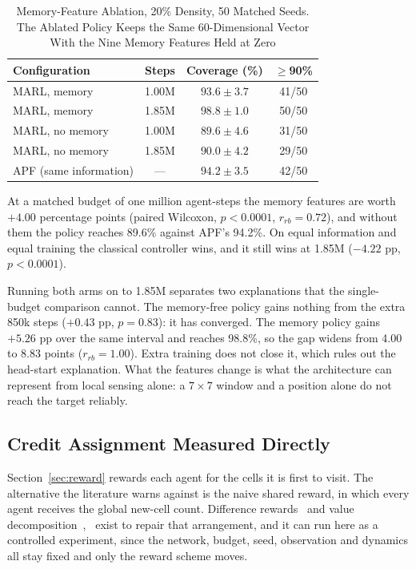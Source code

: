 \documentclass[a4paper, 10pt, conference]{ieeeconf}
\begin{document}
\begin{table}[htb]
\centering
\caption{Memory-Feature Ablation, 20\% Density, 50 Matched Seeds. The
Ablated Policy Keeps the Same 60-Dimensional Vector With the Nine
Memory Features Held at Zero}
\label{tab:ablation}
\scriptsize
\setlength{\tabcolsep}{3pt}
\begin{tabular}{lccc}
\toprule
\textbf{Configuration} & \textbf{Steps} & \textbf{Coverage (\%)} &
\textbf{$\geq$90\%} \\
\midrule
MARL, memory     & 1.00M & $93.6\pm3.7$ & 41/50 \\
MARL, memory     & 1.85M & $98.8\pm1.0$ & 50/50 \\
MARL, no memory  & 1.00M & $89.6\pm4.6$ & 31/50 \\
MARL, no memory  & 1.85M & $90.0\pm4.2$ & 29/50 \\
APF (same information) & --- & $94.2\pm3.5$ & 42/50 \\
\bottomrule
\end{tabular}
\end{table}

At a matched budget of one million agent-steps the memory features are
worth $+4.00$ percentage points (paired Wilcoxon, $p<0.0001$,
$r_{rb}=0.72$), and without them the policy reaches 89.6\% against
APF's 94.2\%. On equal information and equal training the classical
controller wins, and it still wins at 1.85M ($-4.22$ pp, $p<0.0001$).

Running both arms on to 1.85M separates two explanations that the
single-budget comparison cannot. The memory-free policy gains nothing
from the extra 850k steps ($+0.43$ pp, $p=0.83$): it has converged.
The memory policy gains $+5.26$ pp over the same interval and reaches
98.8\%, so the gap widens from 4.00 to 8.83 points ($r_{rb}=1.00$).
Extra training does not close it, which rules out the head-start
explanation. What the features change is what the architecture can
represent from local sensing alone: a $7\times7$ window and a position
alone do not reach the target reliably.

\subsection{Credit Assignment Measured Directly}
\label{sec:credit}

Section~\ref{sec:reward} rewards each agent for the cells it is first
to visit. The alternative the literature warns against is the naive
shared reward, in which every agent receives the global new-cell
count. Difference rewards~\cite{foerster2018} and value
decomposition~\cite{sunehag2018},~\cite{rashid2018} exist to repair
that arrangement, and it can run here as a controlled experiment,
since the network, budget, seed, observation and dynamics all stay
fixed and only the reward scheme moves.
\end{document}

